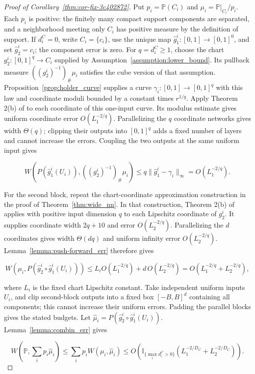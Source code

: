 \begin{proof}[Proof of Corollary~\ref{thm:cor-fix-3c402872}]
Put $p_i=\mathbb P(C_i)$ and $\mu_i=\mathbb P|_{C_i}/p_i$. Each $p_i$ is positive: the finitely many compact support components are separated, and a neighborhood meeting only $C_i$ has positive measure by the definition of support. If $d_i^C=0$, write $C_i=\{c_i\}$, use the unique map $\hat g_1^i:[0,1]\rightarrow[0,1]^0$, and set $\hat g_2^i=c_i$; the component error is zero. For $q=d_i^C\geqslant1$, choose the chart $g_2^i:[0,1]^q\rightarrow C_i$ supplied by Assumption~\ref{assumption:lower_bound}. Its pullback measure $((g_2^i)^{-1})_{\#}\mu_i$ satisfies the cube version of that assumption. Proposition~\ref{prop:holder_curve} supplies a curve $\gamma_i:[0,1]\rightarrow[0,1]^q$ with this law and coordinate moduli bounded by a constant times $r^{1/q}$. Apply Theorem 2(b) of \cite{Yarotsky2018OptimalAO} to each coordinate of this one-input curve. Its modulus estimate gives uniform coordinate error $O(L_1^{-2/q})$. Parallelizing the $q$ coordinate networks gives width $\Theta(q)$; clipping their outputs into $[0,1]^q$ adds a fixed number of layers and cannot increase the errors. Coupling the two outputs at the same uniform input gives

\[
W(P(\hat g_1^i(U_i)),((g_2^i)^{-1})_{\#}\mu_i)\leqslant q\|\hat g_1^i-\gamma_i\|_\infty=O(L_1^{-2/q}).
\]

For the second block, repeat the chart-coordinate approximation construction in the proof of Theorem~\ref{thm:wide_nn}. In that construction, Theorem 2(b) of \cite{Yarotsky2018OptimalAO} applies with positive input dimension $q$ to each Lipschitz coordinate of $g_2^i$. It supplies coordinate width $2q+10$ and error $O(L_2^{-2/q})$. Parallelizing the $d$ coordinates gives width $\Theta(dq)$ and uniform infinity error $O(L_2^{-2/q})$. Lemma~\ref{lemma:push-forward_err} therefore gives

\[
W(\mu_i,P(\hat g_2^i\circ\hat g_1^i(U_i)))\leqslant L_i O(L_1^{-2/q})+d\,O(L_2^{-2/q})=O(L_1^{-2/q}+L_2^{-2/q}),
\]

where $L_i$ is the fixed chart Lipschitz constant. Take independent uniform inputs $U_i$, and clip second-block outputs into a fixed box $[-B,B]^d$ containing all components; this cannot increase their uniform errors. Padding the parallel blocks gives the stated budgets. Let $\hat\mu_i=P(\hat g_2^i\circ\hat g_1^i(U_i))$. Lemma~\ref{lemma:combin_err} gives

\[
W\left(\mathbb P,\sum_i p_i\hat\mu_i\right)\leqslant\sum_i p_iW(\mu_i,\hat\mu_i)\leqslant O\left(\mathbb I_{\{\max_i d_i^C>0\}}(L_1^{-2/D_C}+L_2^{-2/D_C})\right).
\]


\end{proof}
